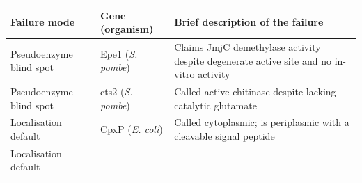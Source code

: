 \documentclass[
  11pt,
]{article}
\begin{document}
\begin{longtable}[]{@{}lll@{}}
\toprule
\begin{minipage}[b]{0.30\columnwidth}\raggedright
Failure mode\strut
\end{minipage} & \begin{minipage}[b]{0.30\columnwidth}\raggedright
Gene (organism)\strut
\end{minipage} & \begin{minipage}[b]{0.30\columnwidth}\raggedright
Brief description of the failure\strut
\end{minipage}\tabularnewline
\midrule
\endhead
\begin{minipage}[t]{0.30\columnwidth}\raggedright
Pseudoenzyme blind spot\strut
\end{minipage} & \begin{minipage}[t]{0.30\columnwidth}\raggedright
Epe1 (\emph{S. pombe})\strut
\end{minipage} & \begin{minipage}[t]{0.30\columnwidth}\raggedright
Claims JmjC demethylase activity despite degenerate active site and no
in-vitro activity\strut
\end{minipage}\tabularnewline
\begin{minipage}[t]{0.30\columnwidth}\raggedright
Pseudoenzyme blind spot\strut
\end{minipage} & \begin{minipage}[t]{0.30\columnwidth}\raggedright
cts2 (\emph{S. pombe})\strut
\end{minipage} & \begin{minipage}[t]{0.30\columnwidth}\raggedright
Called active chitinase despite lacking catalytic glutamate\strut
\end{minipage}\tabularnewline
\begin{minipage}[t]{0.30\columnwidth}\raggedright
Localisation default\strut
\end{minipage} & \begin{minipage}[t]{0.30\columnwidth}\raggedright
CpxP (\emph{E. coli})\strut
\end{minipage} & \begin{minipage}[t]{0.30\columnwidth}\raggedright
Called cytoplasmic; is periplasmic with a cleavable signal peptide\strut
\end{minipage}\tabularnewline
\begin{minipage}[t]{0.30\columnwidth}\raggedright
Localisation default\strut
\end{minipage} & \begin{minipage}[t]{0.30\columnwidth}\raggedright

\end{minipage}
\end{longtable}
\end{document}
